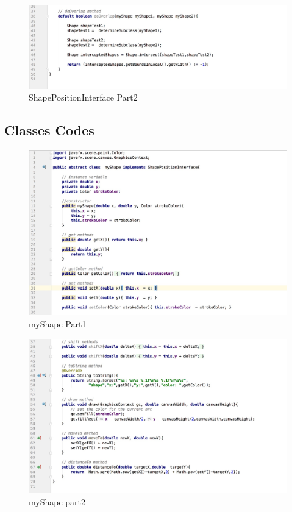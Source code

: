 \documentclass[a4paper,12pt]{article}
\begin{document}
\begin{figure}[H]
   \centering
   \includegraphics[width = 17cm]{ShapePositionInterface_part2} %
   \caption{ShapePositionInterface Part2}
   \label{ShapePositionInterface Part2}
\end{figure}

\subsection{Classes Codes}

\begin{figure}[H]
   \centering
   \includegraphics[width = 17cm]{myShape_part1} %
   \caption{myShape Part1}
   \label{myShape Part1}
\end{figure}


\begin{figure}[H]
   \centering
   \includegraphics[width = 17cm]{myShape_part2} %
   \caption{myShape part2}
   \label{myShape part2}
\end{figure}
\end{document}
